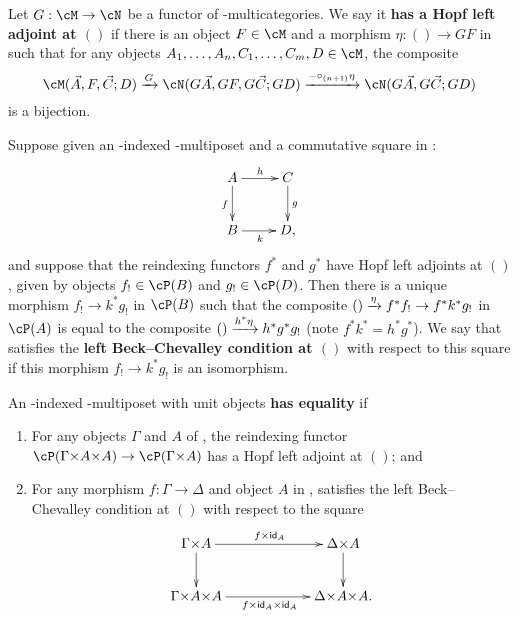 \begin{defn}\label{defn:multicat-hopf-ladj-empty}
  Let $G:\cM\to\cN$ be a functor of \fS-multicategories.
  We say it \textbf{has a Hopf left adjoint at $()$} if there is an object $F\in\cM$ and a morphism $\eta:()\to GF$ in \cN such that for any objects $A_1,\dots,A_n,C_1,\dots,C_m,D\in \cM$, the composite
  \[ \cM(\vec A,F,\vec C;D) \xto{G} \cN(G\vec A, GF, G\vec C; GD) \xto{-\circ_{(n+1)} \eta} \cN(G\vec A, G\vec C; GD) \]
  is a bijection.
\end{defn}

\begin{defn}
  Suppose given an \cS-indexed \fS-multiposet \cP and a commutative square in \cS:
  \[ \xymatrix{ A \ar[r]^h \ar[d]_f & C \ar[d]^g \\ B \ar[r]_k & D, } \]
  and suppose that the reindexing functors $f^*$ and $g^*$ have Hopf left adjoints at $()$, given by objects $f_!\in \cP(B)$ and $g_!\in \cP(D)$.
  Then there is a unique morphism $f_! \to k^* g_!$ in $\cP(B)$ such that the composite $() \xrightarrow{\eta} f^* f_! \to f^* k^* g_!$ in $\cP(A)$ is equal to the composite $() \xrightarrow{h^* \eta} h^* g^* g_!$ (note $f^* k^* = h^* g^*$).
  We say that \cP satisfies the \textbf{left Beck--Chevalley condition at $()$} with respect to this square if this morphism $f_! \to k^* g_!$ is an isomorphism.
\end{defn}


\begin{defn}
  An \cS-indexed \fS-multiposet with unit objects \textbf{has equality} if
  \begin{enumerate}
  \item For any objects $\Gamma$ and $A$ of \cS, the reindexing functor $\cP(\Gamma\times A\times A) \to \cP(\Gamma\times A)$ has a Hopf left adjoint at $()$; and
  \item For any morphism $f:\Gamma\to\Delta$ and object $A$ in \cS, \cP satisfies the left Beck--Chevalley condition at $()$ with respect to the square
    \[ \xymatrix@C=5pc{ \Gamma\times A \ar[r]^{f\times \idfunc_A} \ar[d] & \Delta\times A \ar[d] \\
      \Gamma\times A\times A \ar[r]_{f\times \idfunc_A \times \idfunc_A} & \Delta\times A\times A. } \]
  \end{enumerate}
\end{defn}

